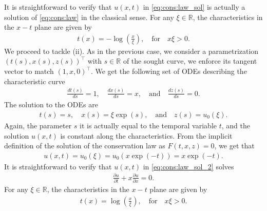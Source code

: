 \documentclass[10pt,letterpaper]{article}
\theoremstyle{break}
\begin{document}
\begin{solution}
	It is straightforward to verify that $u(x,t)$ in \eqref{eq:cons:law_sol}
	is actually a solution of \eqref{eq:cons:law} in the classical sense. 
	For any $\xi \in \mathbb{R}$, the characteristics in the $x-t$ plane are given by
	\begin{align}
		t(x)
		=
		-
		\log
		\left(
			\frac{x}{\xi}
		\right),
		\quad
		\text{for}
		\quad
		x \xi>0.
	\end{align}
	We proceed to tackle (ii).
	As in the previous case, we consider a parametrization
	$(t(s),x(s),z(s))^\top$ with $s \in \mathbb{R}$ of the sought curve, we enforce its tangent 
	vector to match $ (1,x,0)^\top$. We get the following set of ODEs
	describing the characteristic curve
	\begin{align}
		\frac{dt(s)}{ds} =1,
		\quad
		\frac{dx(s)}{ds} =x,
		\quad
		\text{and}
		\quad
		\frac{dz(s)}{ds} =0.
	\end{align}
	The solution to the ODEs are
	\begin{align}
		t(s) =s,
		\quad
		x(s) = \xi \exp(s),
		\quad
		\text{and}
		\quad
		z(s) = u_0(\xi).
	\end{align}
	Again, the parameter $s$ it is 
	actually equal to the temporal variable $t$, and
	the solution $u(x,t)$ is constant along the characteristics.
	From the implicit definition of the solution of the conservation law
	as $F(t,x,z) =0$, we get that 
	\begin{align}\label{eq:cons:law_sol_2}
		u(x,t) = u_0(\xi) = u_0(x \exp(-t)) = x \exp(-t).
	\end{align}
	It is straightforward to verify that $u(x,t)$ in \eqref{eq:cons:law_sol_2}
	solves
	\begin{align}
		\frac{\partial u}{\partial t}
		+
		x
		\frac{\partial u}{\partial x}
		= 0.
	\end{align}
	For any $\xi \in \mathbb{R}$, the characteristics in the $x-t$ plane are given by
	\begin{align}
		t(x)
		=
		\log
		\left(
			\frac{x}{\xi}
		\right),
		\quad
		\text{for}
		\quad
		x \xi>0.
	\end{align}
\end{solution}
\end{document}
